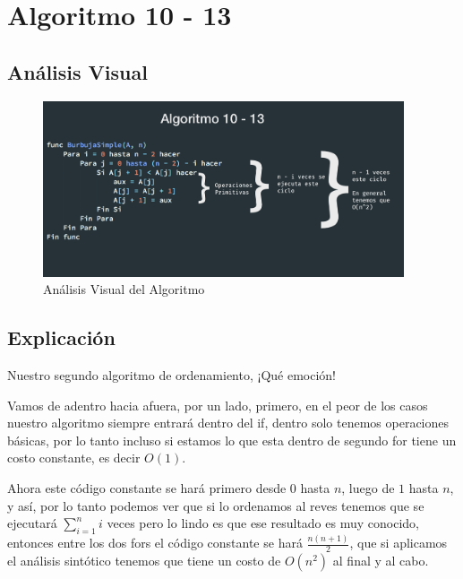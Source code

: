 \documentclass[12pt, fleqn]{article}                            %
\theoremstyle{break}                                            %
\begin{document}
\section{Algoritmo 10 - 13}


    \subsection{Análisis Visual}

        \begin{figure}[h]
            \centering
            \includegraphics[width=0.95\textwidth]{Algoritmo10}
            \caption{Análisis Visual del Algoritmo}
        \end{figure}

    \vspace{1em}
    \subsection{Explicación}

        Nuestro segundo algoritmo de ordenamiento, ¡Qué emoción!

        Vamos de adentro hacia afuera, por un lado, primero, en el peor de los casos
        nuestro algoritmo siempre entrará dentro del if, dentro solo tenemos operaciones
        básicas, por lo tanto incluso si estamos lo que esta dentro de segundo for tiene un costo
        constante, es decir $O(1)$.

        Ahora este código constante se hará primero desde $0$ hasta $n$, luego de $1$ hasta $n$, y 
        así, por lo tanto podemos ver que si lo ordenamos al reves tenemos que se ejecutará $\sum_{i=1}^n i$
        veces pero lo lindo es que ese resultado es muy conocido, entonces entre los dos fors el código
        constante se hará $\frac{n(n+1)}{2}$, que si aplicamos el análisis sintótico tenemos que tiene
        un costo de $O(n^2)$ al final y al cabo.
\end{document}
